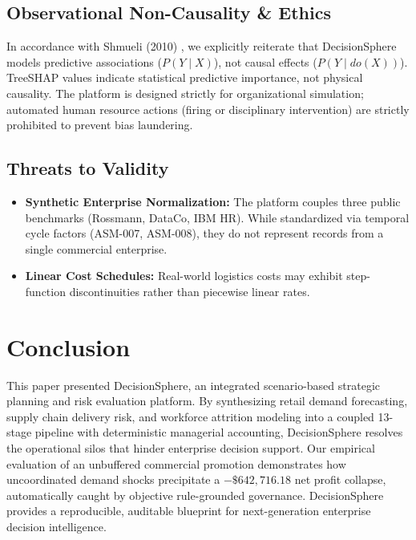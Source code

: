 \documentclass[conference]{IEEEtran}
\begin{document}
\subsection{Observational Non-Causality & Ethics}
In accordance with Shmueli (2010) \cite{shmueli2010explain}, we explicitly reiterate that DecisionSphere models predictive associations ($P(Y \mid X)$), not causal effects ($P(Y \mid do(X))$). TreeSHAP values indicate statistical predictive importance, not physical causality. The platform is designed strictly for organizational simulation; automated human resource actions (firing or disciplinary intervention) are strictly prohibited to prevent bias laundering.

\subsection{Threats to Validity}
\begin{itemize}
    \item \textbf{Synthetic Enterprise Normalization:} The platform couples three public benchmarks (Rossmann, DataCo, IBM HR). While standardized via temporal cycle factors (ASM-007, ASM-008), they do not represent records from a single commercial enterprise.
    \item \textbf{Linear Cost Schedules:} Real-world logistics costs may exhibit step-function discontinuities rather than piecewise linear rates.
\end{itemize}

\section{Conclusion}

This paper presented DecisionSphere, an integrated scenario-based strategic planning and risk evaluation platform. By synthesizing retail demand forecasting, supply chain delivery risk, and workforce attrition modeling into a coupled 13-stage pipeline with deterministic managerial accounting, DecisionSphere resolves the operational silos that hinder enterprise decision support. Our empirical evaluation of an unbuffered commercial promotion demonstrates how uncoordinated demand shocks precipitate a $-\$642,716.18$ net profit collapse, automatically caught by objective rule-grounded governance. DecisionSphere provides a reproducible, auditable blueprint for next-generation enterprise decision intelligence.



\end{document}
